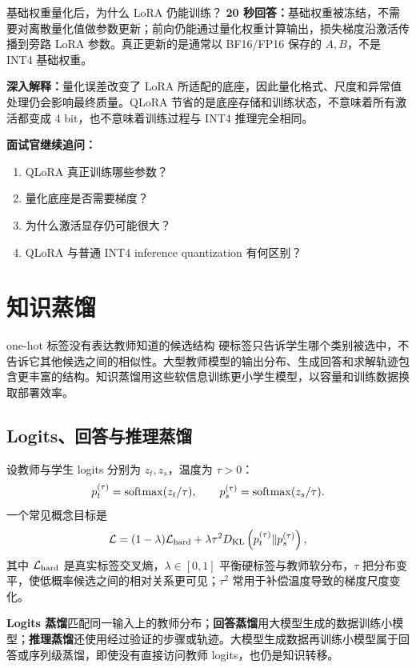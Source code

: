 \begin{interviewbox}{基础权重量化后，为什么 LoRA 仍能训练？}
\textbf{20 秒回答：}基础权重被冻结，不需要对离散量化值做参数更新；前向仍能通过量化权重计算输出，损失梯度沿激活传播到旁路 LoRA 参数。真正更新的是通常以 BF16/FP16 保存的 $A,B$，不是 INT4 基础权重。

\textbf{深入解释：}量化误差改变了 LoRA 所适配的底座，因此量化格式、尺度和异常值处理仍会影响最终质量。QLoRA 节省的是底座存储和训练状态，不意味着所有激活都变成 4 bit，也不意味着训练过程与 INT4 推理完全相同。

\textbf{面试官继续追问：}
\begin{enumerate}
  \item QLoRA 真正训练哪些参数？
  \item 量化底座是否需要梯度？
  \item 为什么激活显存仍可能很大？
  \item QLoRA 与普通 INT4 inference quantization 有何区别？
\end{enumerate}
\end{interviewbox}

\chapter{知识蒸馏}
\label{sec:distillation}

\begin{motivationbox}{one-hot 标签没有表达教师知道的候选结构}
硬标签只告诉学生哪个类别被选中，不告诉它其他候选之间的相似性。大型教师模型的输出分布、生成回答和求解轨迹包含更丰富的结构。知识蒸馏用这些软信息训练更小学生模型，以容量和训练数据换取部署效率。
\end{motivationbox}

\section{Logits、回答与推理蒸馏}

设教师与学生 logits 分别为 $z_t,z_s$，温度为 $\tau>0$：
\[
p_t^{(\tau)}=\operatorname{softmax}(z_t/\tau),\qquad
p_s^{(\tau)}=\operatorname{softmax}(z_s/\tau).
\]
一个常见概念目标是
\[
\mathcal L=(1-\lambda)\mathcal L_{\rm hard}
+\lambda\tau^2D_{\rm KL}
\left(p_t^{(\tau)}\Vert p_s^{(\tau)}\right),
\]
其中 $\mathcal L_{\rm hard}$ 是真实标签交叉熵，$\lambda\in[0,1]$ 平衡硬标签与教师软分布，$\tau$ 把分布变平，使低概率候选之间的相对关系更可见；$\tau^2$ 常用于补偿温度导致的梯度尺度变化。

\textbf{Logits 蒸馏}匹配同一输入上的教师分布；\textbf{回答蒸馏}用大模型生成的数据训练小模型；\textbf{推理蒸馏}还使用经过验证的步骤或轨迹。大模型生成数据再训练小模型属于回答或序列级蒸馏，即使没有直接访问教师 logits，也仍是知识转移。

